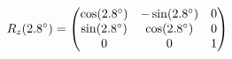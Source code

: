 \documentclass[preview]{standalone}
\begin{document}
\begin{align*}
\special{dvisvgm:raw <g id='unique000'>}R_z(2.8^\circ) = \begin{pmatrix} \cos(2.8^\circ) & -\sin(2.8^\circ) & 0 \\ \sin(2.8^\circ) & \cos(2.8^\circ) & 0 \\ 0 & 0 & 1 \end{pmatrix}\special{dvisvgm:raw </g>}
\end{align*}
\end{document}
